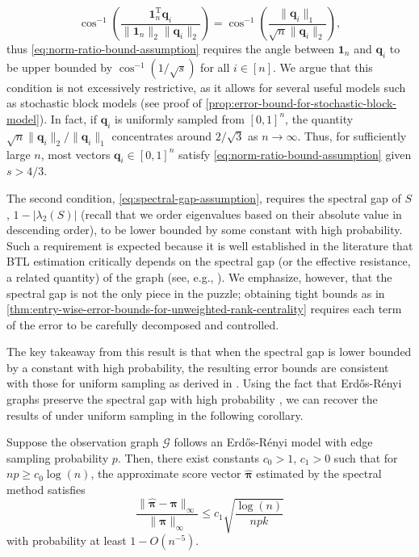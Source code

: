 \documentclass[sigconf,nonacm,pbalance]{acmart}
\newcommand{\tran}{{\mathrm{T}}}
\begin{document}
\begin{equation}
\cos^{-1}\left(\frac{\bm{1}_n^\tran \bm{q}_i}{\|\bm{1}_n\|_2 \|\bm{q}_i\|_2}\right) = \cos^{-1}\left(\frac{\|\bm{q}_i\|_1}{\sqrt{n} \|\bm{q}_i\|_2}\right),
\end{equation}
thus \cref{eq:norm-ratio-bound-assumption} requires the angle between $\bm{1}_n$ and $\bm{q}_i$ to be upper bounded by $\cos^{-1}(1/\sqrt{s})$ for all $i\in[n]$.
We argue that this condition is not excessively restrictive, as it allows for several useful models such as stochastic block models (see proof of \cref{prop:error-bound-for-stochastic-block-model}). In fact, if $\bm{q}_i$ is uniformly sampled from $[0, 1]^n$, the quantity $\sqrt{n}\|\bm{q}_i\|_2/\|\bm{q}_i\|_1$ concentrates around $2/\sqrt{3}$ as $n\to\infty$. Thus, for sufficiently large $n$, most vectors $\bm{q}_i\in[0,1]^n$ satisfy \cref{eq:norm-ratio-bound-assumption} given $s > 4/3$.

The second condition, \cref{eq:spectral-gap-assumption}, requires the spectral gap of $S$, $1-|\lambda_2(S)|$ (recall that we order eigenvalues based on their absolute value in descending order), to be lower bounded by some constant with high probability. Such a requirement is expected because it is well established in the literature that BTL estimation critically depends on the spectral gap (or the effective resistance, a related quantity) of the graph (see, e.g., \cite{NegahbanOhShah2017,Shahetal2016,RankingGeneralGraphsLocality}). We emphasize, however, that the spectral gap is not the only piece in the puzzle; obtaining tight bounds as in \cref{thm:entry-wise-error-bounds-for-unweighted-rank-centrality} requires each term of the error to be carefully decomposed and controlled.

The key takeaway from this result is that when the spectral gap is lower bounded by a constant with high probability, the resulting error bounds are consistent with those for uniform sampling as derived in \cite{Chenetal2019}. Using the fact that Erd\H{o}s-R\'{e}nyi graphs preserve the spectral gap with high probability \cite{NegahbanOhShah2017}, we can recover the results of \cite{Chenetal2019} under uniform sampling in the following corollary.
\begin{corollary}\label{cor:error-bound-under-erdos-renyi-graphs}
Suppose the observation graph $\mathcal{G}$ follows an Erd\H{o}s-R\'{e}nyi model with edge sampling probability $p$. Then, there exist constants $c_0>1$, $c_1>0$ such that for $np \geq c_0 \log (n)$, the approximate score vector $\hat{\bm{\pi}}$ estimated by the spectral method satisfies
\begin{equation}
    \frac{\|\hat{\bm{\pi}}-\bm{\pi}\|_\infty}{\|\bm{\pi}\|_\infty} \leq c_1 \sqrt{\frac{\log(n)}{npk}}
\end{equation}
with probability at least $1-O(n^{-5})$.
\end{corollary}
\end{document}
